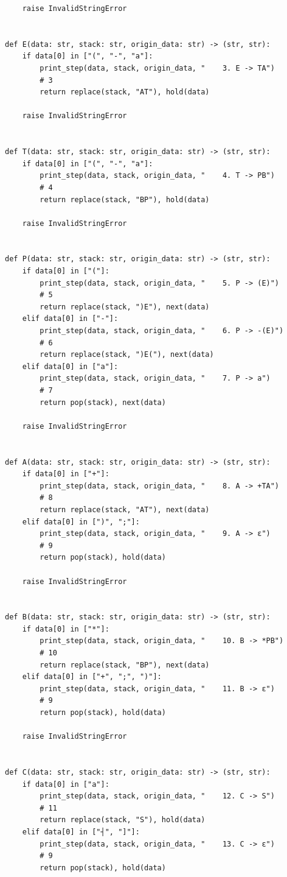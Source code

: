 \documentclass[a4paper,14pt]{extarticle}
\begin{document}
\begin{enumerate}[1.]
\begin{verbatim}
    raise InvalidStringError


def E(data: str, stack: str, origin_data: str) -> (str, str):
    if data[0] in ["(", "-", "a"]:
        print_step(data, stack, origin_data, "    3. E -> TA")
        # 3
        return replace(stack, "AT"), hold(data)

    raise InvalidStringError


def T(data: str, stack: str, origin_data: str) -> (str, str):
    if data[0] in ["(", "-", "a"]:
        print_step(data, stack, origin_data, "    4. T -> PB")
        # 4
        return replace(stack, "BP"), hold(data)

    raise InvalidStringError


def P(data: str, stack: str, origin_data: str) -> (str, str):
    if data[0] in ["("]:
        print_step(data, stack, origin_data, "    5. P -> (E)")
        # 5
        return replace(stack, ")E"), next(data)
    elif data[0] in ["-"]:
        print_step(data, stack, origin_data, "    6. P -> -(E)")
        # 6
        return replace(stack, ")E("), next(data)
    elif data[0] in ["a"]:
        print_step(data, stack, origin_data, "    7. P -> a")
        # 7
        return pop(stack), next(data)

    raise InvalidStringError


def A(data: str, stack: str, origin_data: str) -> (str, str):
    if data[0] in ["+"]:
        print_step(data, stack, origin_data, "    8. A -> +TA")
        # 8
        return replace(stack, "AT"), next(data)
    elif data[0] in [")", ";"]:
        print_step(data, stack, origin_data, "    9. A -> ε")
        # 9
        return pop(stack), hold(data)

    raise InvalidStringError


def B(data: str, stack: str, origin_data: str) -> (str, str):
    if data[0] in ["*"]:
        print_step(data, stack, origin_data, "    10. B -> *PB")
        # 10
        return replace(stack, "BP"), next(data)
    elif data[0] in ["+", ";", ")"]:
        print_step(data, stack, origin_data, "    11. B -> ε")
        # 9
        return pop(stack), hold(data)

    raise InvalidStringError


def C(data: str, stack: str, origin_data: str) -> (str, str):
    if data[0] in ["a"]:
        print_step(data, stack, origin_data, "    12. C -> S")
        # 11
        return replace(stack, "S"), hold(data)
    elif data[0] in ["┤", "]"]:
        print_step(data, stack, origin_data, "    13. C -> ε")
        # 9
        return pop(stack), hold(data)


\end{verbatim}
\end{enumerate}
\end{document}
